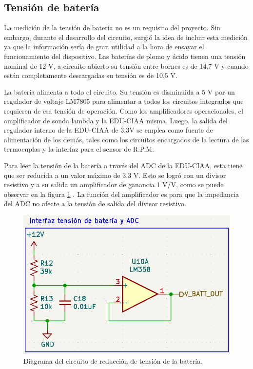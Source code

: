 \subsection{Tensión de batería}

La medición de la tensión de batería no es un requisito del proyecto. Sin embargo, durante el desarrollo del circuito, surgió la idea de incluir esta medición ya que la información sería de gran utilidad a la hora de ensayar el funcionamiento del dispositivo.
Las baterías de plomo y ácido tienen una tensión nominal de 12 V, a circuito abierto su tensión entre bornes es de 14,7 V y cuando están completamente descargadas su tensión es de 10,5 V.

La batería alimenta a todo el circuito. Su tensión es disminuida a 5 V por un regulador de voltaje LM7805 para alimentar a todos los circuitos integrados que requieren de esa tensión de operación. Como los amplificadores operacionales, el amplificador de sonda lambda y la EDU-CIAA misma. Luego, la salida del regulador interno de la EDU-CIAA de 3,3V se emplea como fuente de alimentación de los demás, tales como los circuitos encargados de la lectura de las termocuplas y la interfaz para el sensor de R.P.M.

Para leer la tensión de la batería a través del ADC de la EDU-CIAA, esta tiene que ser reducida a un valor máximo de 3,3 V. Esto se logró con un divisor resistivo y a su salida un amplificador de ganancia 1 V/V, como se puede observar en la figura \ref{fig:circuito-bat} . La función del amplificador es para que la impedancia del ADC no afecte a la tensión de salida del divisor resistivo.

\begin{figure}[htpb]
\centering
\includegraphics[width=.7\textwidth]{./Figures/ampli-bat.png}
\caption{Diagrama del circuito de reducción de tensión de la batería.}
\label{fig:circuito-bat}
\end{figure}

